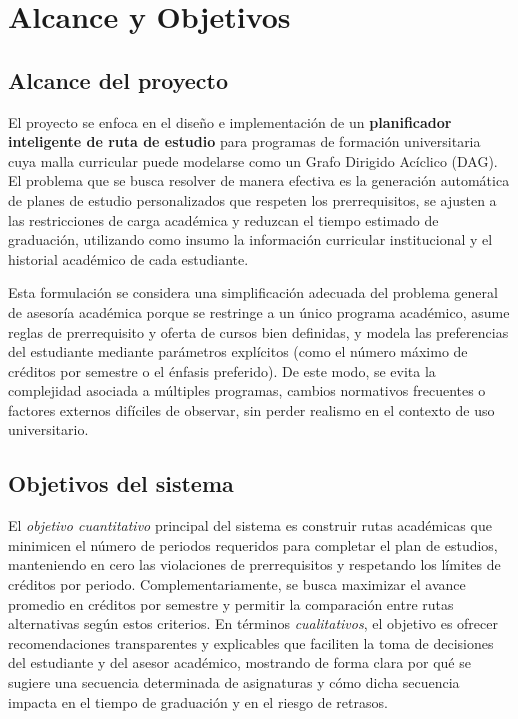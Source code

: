 \section{Alcance y Objetivos}


\subsection{Alcance del proyecto}
El proyecto se enfoca en el diseño e implementación de un \textbf{planificador inteligente de ruta de estudio} para programas de formación universitaria cuya malla curricular puede modelarse como un Grafo Dirigido Acíclico (DAG). El problema que se busca resolver de manera efectiva es la generación automática de planes de estudio personalizados que respeten los prerrequisitos, se ajusten a las restricciones de carga académica y reduzcan el tiempo estimado de graduación, utilizando como insumo la información curricular institucional y el historial académico de cada estudiante.

Esta formulación se considera una simplificación adecuada del problema general de asesoría académica porque se restringe a un único programa académico, asume reglas de prerrequisito y oferta de cursos bien definidas, y modela las preferencias del estudiante mediante parámetros explícitos (como el número máximo de créditos por semestre o el énfasis preferido). De este modo, se evita la complejidad asociada a múltiples programas, cambios normativos frecuentes o factores externos difíciles de observar, sin perder realismo en el contexto de uso universitario.



\subsection{Objetivos del sistema}

El \textit{objetivo cuantitativo} principal del sistema es construir rutas académicas que minimicen el número de periodos requeridos para completar el plan de estudios, manteniendo en cero las violaciones de prerrequisitos y respetando los límites de créditos por periodo. Complementariamente, se busca maximizar el avance promedio en créditos por semestre y permitir la comparación entre rutas alternativas según estos criterios. En términos \textit{cualitativos}, el objetivo es ofrecer recomendaciones transparentes y explicables que faciliten la toma de decisiones del estudiante y del asesor académico, mostrando de forma clara por qué se sugiere una secuencia determinada de asignaturas y cómo dicha secuencia impacta en el tiempo de graduación y en el riesgo de retrasos.

\pagebreak